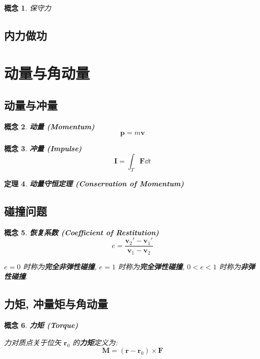 \documentclass[UTF8]{ctexart}
\newcommand{\<}{\langle}
\renewcommand{\>}{\rangle}                              %
\newenvironment{dfn_box}{
    \begin{tcolorbox}[enhanced, colback=dfn_green2, boxrule=0pt, frame hidden,
        borderline west={0.7mm}{0.1mm}{dfn_green1},breakable]
    }
    {\end{tcolorbox}}
\newenvironment{thm_box}{
    \begin{tcolorbox}[enhanced, colback=thm_blue2, boxrule=0pt, frame hidden,
        borderline west={0.7mm}{0.1mm}{thm_blue1},breakable]
    }
    {\end{tcolorbox}}
\theoremstyle{MyStyle} %
\newtheorem{definition}{概念}[subsection]
\newenvironment{cpt}{\begin{dfn_box}\begin{definition}}{\end{definition}\end{dfn_box}}
\newtheorem{theorem}[definition]{定理}
\newenvironment{thm}{\begin{thm_box}\begin{theorem}}{\end{theorem}\end{thm_box}}
\begin{document}
        \begin{cpt}
            保守力
        \end{cpt}
    
    \subsection{内力做功}
        

\section{动量与角动量}

    \subsection{动量与冲量}
        
        \begin{cpt}
            \textbf{动量 (Momentum)}
            \[\bm{p}=m\bm{v}\]
        \end{cpt}
        
        \begin{cpt}
            \textbf{冲量 (Impulse)}
            \[\bm{I}=\int_T\bm{F}\dd t\]
        \end{cpt}
        
        \begin{thm}
            \textbf{动量守恒定理 (Conservation of Momentum)}
        \end{thm}
    
    \subsection{碰撞问题}
        
        \begin{cpt}
            \textbf{恢复系数 (Coefficient of Restitution)}
            \[e=\frac{\bm{v}_2'-\bm{v}_1'}{\bm{v}_1-\bm{v}_2}\]

            \(e=0\) 时称为\textbf{完全非弹性碰撞}, \(e=1\) 时称为\textbf{完全弹性碰撞}, \(0<e<1\) 时称为\textbf{非弹性碰撞}. 
        \end{cpt}

    \subsection{力矩, 冲量矩与角动量}
        
        \begin{cpt}
            \textbf{力矩 (Torque)}

            力对质点关于位矢 \(\bm{r}_0\) 的\textbf{力矩}定义为: 
            \[\bm{M}=(\bm{r}-\bm{r}_0)\times\bm{F}\]
        \end{cpt}
        
\end{document}

